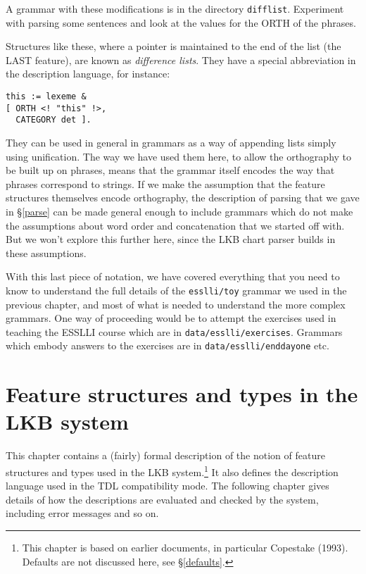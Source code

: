 \documentclass[12pt]{report}
\newcommand{\filename}[1]{{\tt #1}}
\newcommand{\newterm}[1]{{\it #1}}
\begin{document}
A grammar with these modifications is in the directory \filename{difflist}.
Experiment with parsing some sentences 
and look at the values for the ORTH of the phrases.

Structures like these, where a pointer is maintained to the end of the
list (the LAST feature), are known as \newterm{difference lists}.
They have a special abbreviation in the description language, for instance:
\begin{verbatim}
this := lexeme &
[ ORTH <! "this" !>,
  CATEGORY det ].
\end{verbatim}

They can be used in general in grammars as a way of appending lists
simply using unification.
The way we have used them here, to allow the orthography
to be built up on phrases, means that the grammar itself encodes
the way that phrases correspond to strings. 
If we make the assumption that the feature structures themselves
encode orthography, the description of parsing that we gave in
\S\ref{parse} can be made general enough to include grammars
which do not make the assumptions about word order and
concatenation that we started off with.  But we won't explore this
further here, since the LKB chart parser builds in these assumptions.

With this last piece of notation, we have covered everything that
you need to know to understand the full details of the
\filename{esslli/toy} grammar
we used in the previous chapter, and most of what is needed
to understand the more complex grammars.
One way of proceeding would be to attempt the exercises used
in teaching the ESSLLI course which are
in \filename{data/esslli/exercises}.  Grammars which embody
answers to the exercises are in \filename{data/esslli/enddayone} etc.


\chapter{Feature structures and types in the LKB system}
\label{formal}

This chapter contains a (fairly) formal description of the notion of
feature structures and types used in the LKB system.\footnote{This chapter is based
on earlier documents, in particular Copestake (1993).  
Defaults are not discussed here, see \S\ref{defaults}.}
It also defines the description language used in the TDL compatibility mode. 
The following chapter gives details of how the descriptions are
evaluated and checked by the system, including error messages and so on.
 
\end{document}
